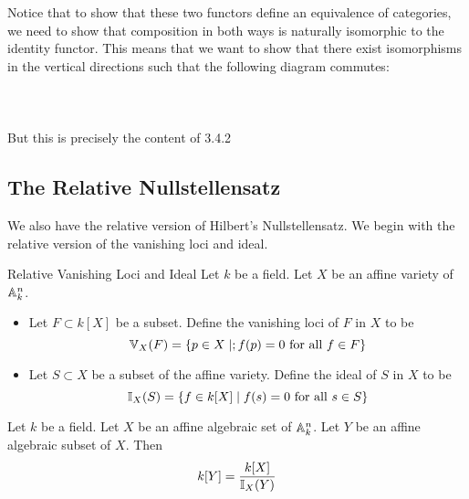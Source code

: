 \documentclass[a4paper]{article}
\begin{document}
Notice that to show that these two functors define an equivalence of categories, we need to show that composition in both ways is naturally isomorphic to the identity functor. This means that we want to show that there exist isomorphisms in the vertical directions such that the following diagram commutes: \\~\\
 \\~\\
But this is precisely the content of 3.4.2
 
\subsection{The Relative Nullstellensatz}
We also have the relative version of Hilbert's Nullstellensatz. We begin with the relative version of the vanishing loci and ideal. 

\begin{defn}{Relative Vanishing Loci and Ideal}{} Let $k$ be a field. Let $X$ be an affine variety of $\mathbb{A}_k^n$. 
\begin{itemize}
\item Let $F\subset k[X]$ be a subset. Define the vanishing loci of $F$ in $X$ to be $$\mathbb{V}_X(F)=\{p\in X\;|;f(p)=0\text{ for all }f\in F\}$$
\item Let $S\subset X$ be a subset of the affine variety. Define the ideal of $S$ in $X$ to be $$\mathbb{I}_X(S)=\{f\in k[X]\;|\;f(s)=0\text{ for all }s\in S\}$$
\end{itemize}
\end{defn}

\begin{lmm}{}{} Let $k$ be a field. Let $X$ be an affine algebraic set of $\mathbb{A}_k^n$. Let $Y$ be an affine algebraic subset of $X$. Then $$k[Y]=\frac{k[X]}{\mathbb{I}_X(Y)}$$
\end{lmm}
\end{document}
